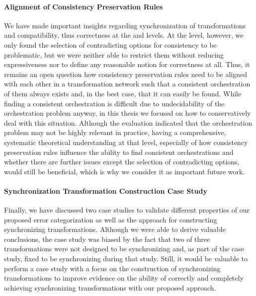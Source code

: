 \paragraph{Alignment of Consistency Preservation Rules}
We have made important insights regarding synchronization of transformations and compatibility, thus correctness at the \leveltransformation and \levelnetworkrelation levels.
At the \levelnetworkrule level, however, we only found the selection of contradicting options for consistency to be problematic, but we were neither able to restrict them without reducing expressiveness nor to define any reasonable notion for correctness at all.
Thus, it remains an open question how consistency preservation rules need to be aligned with each other in a transformation network such that a consistent orchestration of them always exists and, in the best case, that it can easily be found.
While finding a consistent orchestration is difficult due to undecidability of the orchestration problem anyway, in this thesis we focused on how to conservatively deal with this situation.
Although the evaluation indicated that the orchestration problem may not be highly relevant in practice, having a comprehensive, systematic theoretical understanding at that level, especially of how consistency preservation rules influence the ability to find consistent orchestrations and whether there are further issues except the selection of contradicting options, would still be beneficial, which is why we consider it as important future work.

\paragraph{Synchronization Transformation Construction Case Study}
Finally,  we have discussed two case studies to validate different properties of our proposed error categorization as well as the approach for constructing synchronizing transformations.
Although we were able to derive valuable conclusions, the case study was biased by the fact that two of three transformations were not designed to be synchronizing and, as part of the case study, fixed to be synchronizing during that study.
Still, it would be valuable to perform a case study with a focus on the construction of synchronizing transformations to improve evidence on the ability of correctly and completely achieving synchronizing transformations with our proposed approach.


